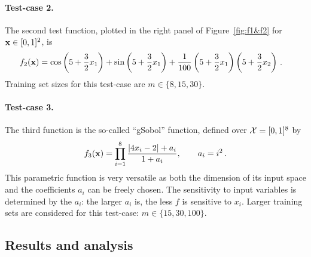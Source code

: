   




\paragraph{Test-case 2.}

The second test function, plotted in the right panel of Figure~\ref{fig:f1&f2} for ${\bf x}\in[0,1]^2$, is 
\begin{align*}
   f_2({\bf x}) 
   &= \cos \left(5 + \frac{3}{2}x_1 \right) + \sin \left(5 + \frac{3}{2}x_1 \right) 
   + \frac{1}{100} \left(5 + \frac{3}{2}x_1 \right) \left(5 + \frac{3}{2}x_2 \right)\,.
\end{align*}
Training set sizes for this test-case are $m\in\{8, 15, 30\}$.

\paragraph{Test-case 3.}

The third function is the so-called ``gSobol'' function, defined over $\mathcal{X}=[0,1]^8$ by
\begin{equation*}
  f_3({\bf x}) = \prod_{i=1}^{8} \frac{|4x_i - 2| + a_i}{1 + a_i}, \qquad a_i = i^2 \,.
\end{equation*}
This parametric function is very versatile as both the dimension of its input space and the coefficients $a_i$ can be freely chosen. 
The sensitivity to input variables is determined by the $a_i$: the larger $a_i$ is, the less $f$ is sensitive to $x_i$. 
Larger training sets are considered for this test-case: $m\in\{15, 30, 100\}$.

\subsection{Results and analysis}


